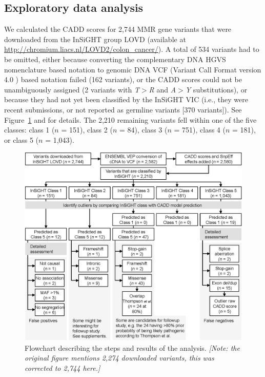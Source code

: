 \subsection{Exploratory data analysis}
We calculated the CADD scores for 2,744 MMR gene variants that were downloaded from the InSiGHT group LOVD (available at \url{http://chromium.liacs.nl/LOVD2/colon_cancer/}).
A total of 534 variants had to be omitted, either because converting the complementary DNA HGVS nomenclature\cite{den_Dunnen_2003} based notation to genomic DNA VCF (Variant Call Format version 4.0 \cite{Danecek_2011}) based notation failed (162 variants), or the CADD scores could not be unambiguously assigned (2 variants with \textsl{T$>$R} and \textsl{A$>$Y} substitutions), or because they had not yet been classified by the InSiGHT VIC (i.e., they were recent submissions, or not reported as germline variants [370 variants]).
See Figure~\ref{fig:flowchart} and \textsl{} for details.
The 2,210 remaining variants fell within one of the five classes: class 1 ($n$ = 151), class 2 ($n$ = 84), class 3 ($n$ = 751), class 4 ($n$ = 181), or class 5 ($n$ = 1,043).

\begin{figure}[htb]
  \begin{center}
    \includegraphics[width=1.00\linewidth]{img/caddmmr_flowchart}
  \end{center}
    \caption[Flowchart describing the analysis]{\label{fig:flowchart} Flowchart describing the steps and results of the analysis. \textsl{[Note: the original figure mentions 2,274 downloaded variants, this was corrected to 2,744 here.]}}
\end{figure}

